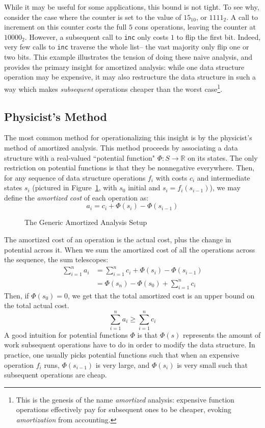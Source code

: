 While it may be useful for some applications, this bound is not tight. To see why, consider the case where the counter is set to the value of $15_{10}$, or $1111_2$. A  call to increment on this counter costs the full $5$ cons operations, leaving the counter at $10000_2$. However, a subsequent call to \texttt{inc} only costs $1$ to flip the first bit. Indeed, very few calls to \texttt{inc} traverse the whole list-- the vast majority only flip one or two bits. This example illustrates the tension of doing these naive analysis, and provides the primary insight for amortized analysis: while one data structure operation may be expensive, it may also restructure the data structure in such a way which makes \textit{subsequent} operations cheaper than the worst case\footnote{
This is the genesis of the name \textit{amortized} analysis: expensive function operations effectively pay for subsequent ones to be cheaper, evoking \textit{amortization} from accounting.
}.

\subsection{Physicist's Method}
The most common method for operationalizing this insight is by the physicist's method of amortized analysis. This method proceeds by associating a data structure with a real-valued ``potential function" $\Phi : S \to \mathbb{R}$ on its states. The only restriction on potential functions is that they be nonnegative everywhere.
Then, for any sequence of data structure operations $f_i$ with costs $c_i$ and intermediate states $s_i$ (pictured in Figure~\ref{fig:amortized-situation}, with $s_0$ initial and $s_i = f_i(s_{i-1})$), we may define the \textit{amortized cost} of each operation as:
$$
a_i = c_i + \Phi(s_i) - \Phi(s_{i-1})
$$

\begin{figure}
  \caption{The Generic Amortized Analysis Setup}
  \label{fig:amortized-situation}
\end{figure}

The amortized cost of an operation is the actual cost, plus the change in potential across it. When we sum the amortized cost of all the operations across the sequence, the sum telescopes:
\begin{align*}
  \sum_{i=1}^n a_i &= \sum_{i=1}^n c_i + \Phi(s_i) - \Phi(s_{i-1})\\
                   &= \Phi(s_n) - \Phi(s_0) + \sum_{i=1}^n c_i
\end{align*}
Then, if $\Phi(s_0) = 0$, we get that the total amortized cost is an upper bound on the total actual cost.
$$
\sum_{i=1}^n a_i \geq \sum_{i=1}^n c_i
$$
A good intuition for potential functions $\Phi$ is that $\Phi(s)$ represents the amount of work subsequent operations have to do in order to modify the data structure.
In practice, one usually picks potential functions such that when an expensive operation $f_i$ runs, $\Phi(s_{i-1})$ is very large, and $\Phi(s_i)$ is very small such that subsequent operations are cheap.

